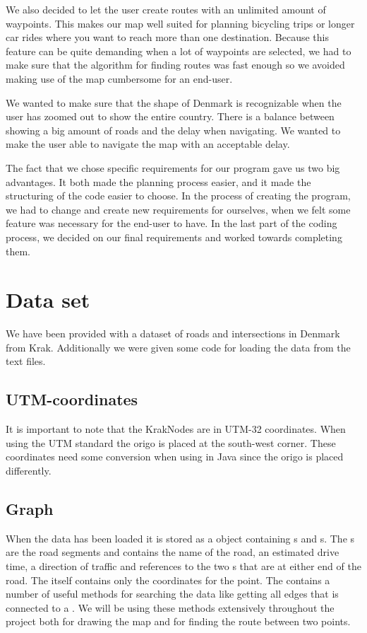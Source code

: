 We also decided to let the user create routes with an unlimited amount of
waypoints. This makes our map well suited for planning bicycling trips or longer
car rides where you want to reach more than one destination. Because this
feature can be quite demanding when a lot of waypoints are selected, we had to
make sure that the algorithm for finding routes was fast enough so we avoided
making use of the map cumbersome for an end-user.

We wanted to make sure that the shape of Denmark is recognizable when
the user has zoomed out to show the entire country. There is a balance between
showing a big amount of roads and the delay when navigating. We wanted to make
the user able to navigate the map with an acceptable delay. 

The fact that we chose specific requirements for our program gave us two big
advantages. It both made the planning process easier, and it made the
structuring of the code easier to choose. In the process of creating the
program, we had to change and create new requirements for ourselves, when we
felt some feature was necessary for the end-user to have. In the last part of
the coding process, we decided on our final requirements and worked towards completing them. 

\section{Data set}
\label{BG-DS}
We have been provided with a dataset of roads and intersections in Denmark 
from Krak. Additionally we were given some code for loading the data from the 
text files.

\subsection{UTM-coordinates}
\label{BG-DS-UTM}
It is important to note that the KrakNodes are in UTM-32 coordinates. When 
using the UTM standard the origo is placed at the south-west corner. These 
coordinates need some conversion when using in Java since the origo is placed 
differently.

\subsection{Graph}
\label{BG-DS-G}
When the data has been loaded it is stored as a  object containing 
s and s. The s are the 
road segments and contains the name of the road, an estimated drive time, 
a direction of traffic and references to the two s that are at 
either end of the road.  The  itself contains only the coordinates 
for the point. The  contains a number of useful methods for 
searching the data like getting all edges that is connected to a . 
We will be using these methods extensively throughout the project both for 
drawing the map and for finding the route between two points.

